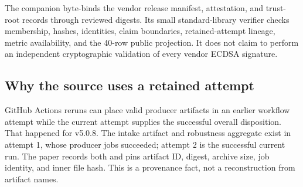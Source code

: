 The companion byte-binds the vendor release manifest, attestation, and trust-root records through
reviewed digests. Its small standard-library verifier checks membership, hashes, identities, claim
boundaries, retained-attempt lineage, metric availability, and the 40-row public projection. It does
not claim to perform an independent cryptographic validation of every vendor ECDSA signature.

\subsection{Why the source uses a retained attempt}

GitHub Actions reruns can place valid producer artifacts in an earlier workflow attempt while the
current attempt supplies the successful overall disposition. That happened for v5.0.8. The intake
artifact and robustness aggregate exist in attempt 1, whose producer jobs succeeded; attempt 2 is
the successful current run. The paper records both and pins artifact ID, digest, archive size, job
identity, and inner file hash. This is a provenance fact, not a reconstruction from artifact names.
